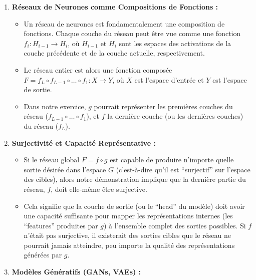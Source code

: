 \documentclass[12pt,a4paper]{report}
\providecommand{\tightlist}{%
  \setlength{\itemsep}{0pt}\setlength{\parskip}{0pt}}
\begin{document}
\begin{enumerate}
\def\labelenumi{\arabic{enumi}.}
\tightlist
\item
  \textbf{Réseaux de Neurones comme Compositions de Fonctions :}

  \begin{itemize}
  \tightlist
  \item
    Un réseau de neurones est fondamentalement une composition de
    fonctions. Chaque couche du réseau peut être vue comme une fonction
    \(f_i: H_{i-1} \to H_i\), où \(H_{i-1}\) et \(H_i\) sont les espaces
    des activations de la couche précédente et de la couche actuelle,
    respectivement.
  \item
    Le réseau entier est alors une fonction composée
    \(F = f_L \circ f_{L-1} \circ \dots \circ f_1: X \to Y\), où \(X\)
    est l'espace d'entrée et \(Y\) est l'espace de sortie.
  \item
    Dans notre exercice, \(g\) pourrait représenter les premières
    couches du réseau (\(f_{L-1} \circ \dots \circ f_1\)), et \(f\) la
    dernière couche (ou les dernières couches) du réseau (\(f_L\)).
  \end{itemize}
\item
  \textbf{Surjectivité et Capacité Représentative :}

  \begin{itemize}
  \tightlist
  \item
    Si le réseau global \(F = f \circ g\) est capable de produire
    n'importe quelle sortie désirée dans l'espace \(G\) (c'est-à-dire
    qu'il est ``surjectif'' sur l'espace des cibles), alors notre
    démonstration implique que la dernière partie du réseau, \(f\), doit
    elle-même être surjective.
  \item
    Cela signifie que la couche de sortie (ou le ``head'' du modèle)
    doit avoir une capacité suffisante pour mapper les représentations
    internes (les ``features'' produites par \(g\)) à l'ensemble complet
    des sorties possibles. Si \(f\) n'était pas surjective, il
    existerait des sorties cibles que le réseau ne pourrait jamais
    atteindre, peu importe la qualité des représentations générées par
    \(g\).
  \end{itemize}
\item
  \textbf{Modèles Génératifs (GANs, VAEs) :}


\end{enumerate}
\end{document}
